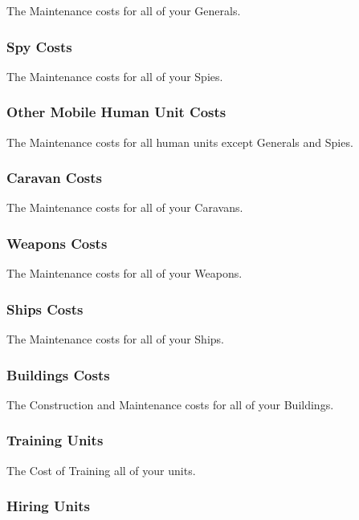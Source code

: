 The Maintenance costs for all of your Generals.

\subsubsection{\textsf{Spy Costs}}

The Maintenance costs for all of your Spies.

\subsubsection{\textsf{Other Mobile Human Unit Costs}}

The Maintenance costs for all human units except Generals and Spies.

\subsubsection{\textsf{Caravan Costs}}

The Maintenance costs for all of your Caravans.

\subsubsection{\textsf{Weapons Costs}}

The Maintenance costs for all of your Weapons.

\subsubsection{\textsf{Ships Costs}}

The Maintenance costs for all of your Ships.

\subsubsection{\textsf{Buildings Costs}}

The Construction and Maintenance costs for all of your Buildings.

\subsubsection{\textsf{Training Units}}

The Cost of Training all of your units.

\subsubsection{\textsf{Hiring Units}}

